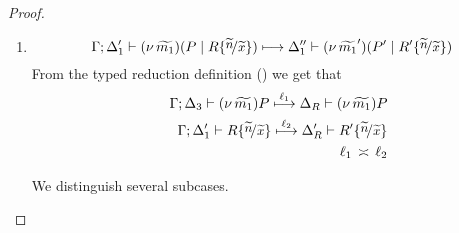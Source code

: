 \begin{proof}
\begin{enumerate}
		\item	\[
					\horel{\Gamma}{\Delta_1'}{\newsp{\widetilde{m_1}}{P \Par R \subst{\widetilde{n}}{\widetilde{x}} }}
					{\hby{}}
					{\Delta_1''}{\newsp{\widetilde{m_1}'}{P' \Par R' \subst{\widetilde{n}}{\widetilde{x}} }}
				\]
				From the typed reduction definition () we get that
				\begin{eqnarray}
					&&	\horel{\Gamma}{\Delta_3}{\news{\widetilde{m_1}}{P}}
						{\hby{\ell_1}}
						{\Delta_R}{\news{\widetilde{m_1}}{P}}
					\label{lem:trigger_subst_31}
					\\
					&&	\horel{\Gamma}{\Delta_1'}{R \subst{\widetilde{n}}{\widetilde{x}} }
						{\hby{\ell_2}}
						{\Delta_R'}{R' \subst{\widetilde{n}}{\widetilde{x}} }
					\label{lem:trigger_subst_32}
					\\
					&&	\ell_1 \comp \ell_2 \nonumber
				\end{eqnarray}

				We distinguish several subcases.
				\begin{enumerate}[i.]
	

\end{enumerate}
\end{enumerate}
\end{proof}

